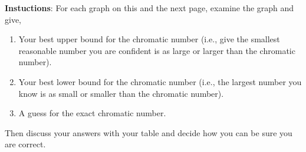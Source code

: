 \documentclass[11pt]{exam}
\begin{document}

\noindent\textbf{Instuctions}: For each graph on this and the next page, examine the graph and give,
\begin{enumerate}
  \item Your best upper bound for the chromatic number (i.e., give the smallest reasonable number you are confident is as large or larger than the chromatic number).
  \item Your best lower bound for the chromatic number (i.e., the largest number you know is as small or smaller than the chromatic number).
  \item A guess for the exact chromatic number.
\end{enumerate}

Then discuss your answers with your table and decide how you can be sure you are correct.




\end{document}
